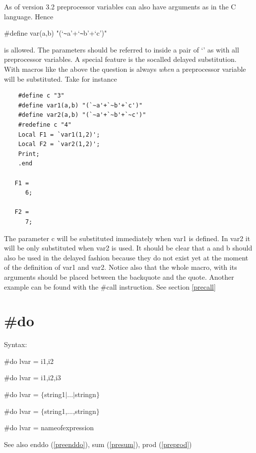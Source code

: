 As of version 3.2 preprocessor variables can also have arguments as in the 
C language. Hence

\#define var(a,b) "(`\verb:~:a'+`\verb:~:b'+`c')"

is allowed. The parameters should be referred to inside a pair of `' as 
with all preprocessor variables. A special feature is the socalled 
delayed 
substitution. With macros like the above the 
question is always {\sl when} a preprocessor variable will be substituted. 
Take for instance
\begin{verbatim}
    #define c "3"
    #define var1(a,b) "(`~a'+`~b'+`c')"
    #define var2(a,b) "(`~a'+`~b'+`~c')"
    #redefine c "4"
    Local F1 = `var1(1,2)';
    Local F2 = `var2(1,2)';
    Print;
    .end

   F1 =
      6;

   F2 =
      7;
\end{verbatim}
The parameter c will be substituted immediately when var1 is defined. In 
var2 it will be only substituted when var2 is used. It should be clear that 
a and b should also be used in the delayed fashion because they do not 
exist yet at the moment of the definition of var1 and var2. Notice also 
that the whole macro, with its arguments should be placed 
between the backquote and the quote. Another example can be found with the 
\#call instruction. See section \ref{precall}

 
\section{\#do}
\label{predo}

\noindent Syntax:

\#do lvar = i1,i2

\#do lvar = i1,i2,i3

\#do lvar = $\{$string1$|$...$|$stringn$\}$

\#do lvar = $\{$string1,...,stringn$\}$

\#do lvar = nameofexpression
 
\noindent See also enddo (\ref{preenddo}), sum (\ref{presum}), prod (\ref{preprod})

